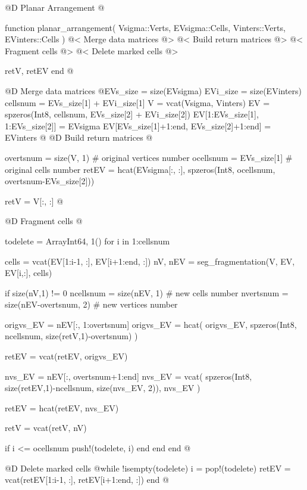 \documentclass[10pt,oneside]{article}
\begin{document}
@D Planar Arrangement
@{function planar_arrangement(
    Vsigma::Verts, EVsigma::Cells, 
    Vinters::Verts, EVinters::Cells
)
    @< Merge data matrices @>
    @< Build return matrices @>
    @< Fragment cells @>
    @< Delete marked cells @>

    retV, retEV
end
@}
@D Merge data matrices
@{EVs_size = size(EVsigma)
EVi_size = size(EVinters)
cellsnum = EVs_size[1] + EVi_size[1]
V = vcat(Vsigma, Vinters)
EV = spzeros(Int8, cellsnum, EVs_size[2] + EVi_size[2])
EV[1:EVs_size[1], 1:EVs_size[2]] = EVsigma
EV[EVs_size[1]+1:end, EVs_size[2]+1:end] = EVinters
@}
@D Build return matrices
@{overtsnum = size(V, 1)  # original vertices number
ocellsnum = EVs_size[1]  # original cells number
retEV = hcat(EVsigma[:, :], spzeros(Int8, ocellsnum, overtsnum-EVs_size[2]))

retV = V[:, :]
@}
@D Fragment cells
@{todelete = Array{Int64, 1}()
for i in 1:cellsnum

    cells = vcat(EV[1:i-1, :], EV[i+1:end, :])
    nV, nEV = seg_fragmentation(V, EV, EV[i,:], cells)

    if size(nV,1) != 0
        ncellsnum = size(nEV, 1) # new cells number
        nvertsnum = size(nEV-overtsnum, 2) # new vertices number

        origvs_EV = nEV[:, 1:overtsnum]
        origvs_EV = hcat(
            origvs_EV,
            spzeros(Int8, ncellsnum, size(retV,1)-overtsnum)
        )
        
        retEV = vcat(retEV, origvs_EV)

        nvs_EV = nEV[:, overtsnum+1:end]
        nvs_EV = vcat(
            spzeros(Int8, size(retEV,1)-ncellsnum, size(nvs_EV, 2)),
            nvs_EV
        )

        retEV = hcat(retEV, nvs_EV)
        
        retV = vcat(retV, nV)

        if i <= ocellsnum
            push!(todelete, i)
        end
    end
end
@}
@D Delete marked cells
@{while !isempty(todelete) 
    i = pop!(todelete)
    retEV = vcat(retEV[1:i-1, :], retEV[i+1:end, :])
end
@}

\end{document}
